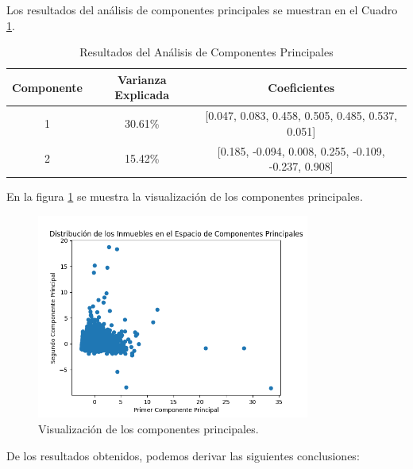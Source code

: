 Los resultados del análisis de componentes principales se muestran en el Cuadro
\ref{table:pca-results}.

\begin{table}[h]
\small
\centering
\begin{tabular}{|c|c|c|}
\hline
\rowcolor{azulclaro}
  \textbf{Componente} & \textbf{Varianza Explicada} & \textbf{Coeficientes} \\ \hline
1 & 30.61\% & [0.047, 0.083, 0.458, 0.505, 0.485, 0.537, 0.051] \\ \hline
2 & 15.42\% & [0.185, -0.094, 0.008, 0.255, -0.109, -0.237, 0.908] \\ \hline
\end{tabular}
\caption{Resultados del Análisis de Componentes Principales}
\label{table:pca-results}
\end{table}

En la figura \ref{fig:pca} se muestra la visualización de los componentes
principales.

\begin{figure}[H]
  \centering
  \includegraphics[width=0.8\textwidth]{imagenes/03-analisis/analisis-econometrico/analisis-pca.png}
  \caption{Visualización de los componentes principales.}
  \label{fig:pca}
\end{figure}

De los resultados obtenidos, podemos derivar las siguientes conclusiones:

